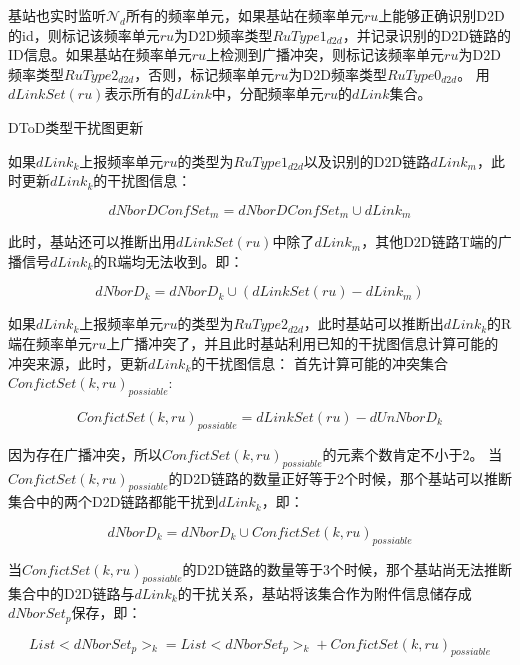 \documentclass[figurelist,tablelist,algorithmlist,nomlist,masters]{seuthesix}
\begin{document}
	基站也实时监听$\mathcal{N}_d$所有的频率单元，如果基站在频率单元$ru$上能够正确识别D2D的id，则标记该频率单元$ru$为D2D频率类型$RuType{1_{d2d}}$，并记录识别的D2D链路的ID信息。如果基站在频率单元$ru$上检测到广播冲突，则标记该频率单元$ru$为D2D频率类型$RuType{2_{d2d}}$，否则，标记频率单元$ru$为D2D频率类型$RuType{0_{d2d}}$。
	用$dLinkSet(ru)$表示所有的$dLink$中，分配频率单元$ru$的$dLink$集合。
	
	
	DToD类型干扰图更新
	
	如果$dLink_k$上报频率单元$ru$的类型为$RuType{1_{d2d}}$以及识别的D2D链路$dLink_m$，此时更新$dLink_k$的干扰图信息：
	
	\begin{equation}\label{eq2.1}
	dNborDConfSe{t_m} = dNborDConfSe{t_m} \cup dLink_m
	\end{equation}
	
	此时，基站还可以推断出用$dLinkSet(ru)$中除了$dLink_m$，其他D2D链路T端的广播信号$dLink_k$的R端均无法收到。即：
	
	\begin{equation}\label{eq2.1}
	dNborD_k = dNborD_k \cup (dLinkSet(ru) - dLink_m)
	\end{equation}
	
	
	
	如果$dLink_k$上报频率单元$ru$的类型为$RuType{2_{d2d}}$，此时基站可以推断出$dLink_k$的R端在频率单元$ru$上广播冲突了，并且此时基站利用已知的干扰图信息计算可能的冲突来源，此时，更新$dLink_k$的干扰图信息：
	首先计算可能的冲突集合$ConfictSet{(k,ru)_{possiable}}$:
	
	\begin{equation}\label{eq2.1}
	ConfictSet{(k,ru)_{possiable}} = dLinkSet(ru) - dUnNborD_k
	\end{equation}
	
	因为存在广播冲突，所以$ConfictSet{(k,ru)_{possiable}}$的元素个数肯定不小于2。
	当$ConfictSet{(k,ru)_{possiable}}$的D2D链路的数量正好等于2个时候，那个基站可以推断集合中的两个D2D链路都能干扰到$dLink_k$，即：
	
	\begin{equation}\label{eq2.1}
	dNborD_k = dNborD_k \cup ConfictSet{(k,ru)_{possiable}}
	\end{equation}
	
	当$ConfictSet{(k,ru)_{possiable}}$的D2D链路的数量等于3个时候，那个基站尚无法推断集合中的D2D链路与$dLink_k$的干扰关系，基站将该集合作为附件信息储存成$dNborSet_{p}$保存，即：
	
	\begin{equation}\label{eq2.1}
	List < dNborSet_{p}{ > _k} = List < dNborSet_{p}{ > _k} + ConfictSet{(k,ru)_{possiable}}
	\end{equation}
	
\end{document}

